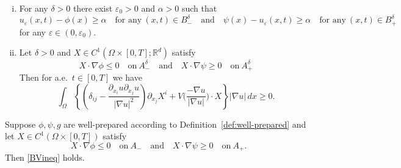 \documentclass[10pt,a4paper]{amsart}
\def\R{{\mathbb{R}}}
\begin{document}
\begin{lemma}\label{lemma3.3}
\begin{enumerate}[(i)]
\item \label{item:lemma3.3(i)} For any $\delta >0$ there exist $\varepsilon_0 >0$ and $\alpha>0$ such that
\begin{equation}\label{lemma3.3(i)}
u_\varepsilon (x,t) - \phi (x) \geq \alpha \quad \text{for any} \ (x,t) \in B_ - ^\delta
\quad \text{and} \quad
\psi (x) - u_\varepsilon (x,t) \geq \alpha \quad \text{for any} \ (x,t) \in B_ + ^\delta
\end{equation}
for any $\varepsilon \in (0,\varepsilon_0)$.
\item\label{item:lemma3.3(ii)} Let $\delta >0$ and $X \in C^1 (\Omega \times [0,T];\R^d)$ satisfy
\begin{equation}
    X \cdot \nabla \phi \leq 0 \quad \text{on} \ A_ - ^\delta
    \quad \text{and} \quad
    X \cdot \nabla \psi \geq 0 \quad \text{on} \ A_ + ^\delta
\end{equation}
Then for a.e.\ $t \in [0,T]$ we have
\begin{equation}\label{BVineq}
\int_{\Omega} \left\{
 \left( \delta_{ij} - \frac{ \partial_{x_i} u \partial _{x_j} u }{|\nabla u|^2} \right)
\partial_{x_j} X^i
+V\Big(\frac{-\nabla u}{|\nabla u|}\Big)  \cdot X\right\} |\nabla u| \, dx
\geq 0.
\end{equation}
\end{enumerate}
\end{lemma}

\begin{theorem}\label{thm:3.4}
Suppose $\phi, \psi, g$ are well-prepared according to Definition~\ref{def:well-prepared} and let $X \in C^1 (\Omega \times [0,T])$ satisfy
    \[
    X \cdot \nabla \phi \leq 0 \quad \text{on} \ A_-
    \quad
    \text{and}
    \quad
    X\cdot \nabla \psi \geq 0 \quad \text{on} \ A_+.
    \]
Then \eqref{BVineq} holds.
\end{theorem}
\end{document}
